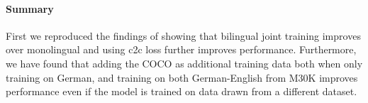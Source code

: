 \paragraph{Summary}
First we reproduced the findings of \cite{kadar2018conll} 
showing that bilingual joint
training improves over monolingual and using c2c loss
further improves performance. 
Furthermore, we have found that adding the COCO as 
additional training data both when only training on German, and training on both German-English from 
M30K improves performance 
even if the model is trained on data drawn from a different dataset.





